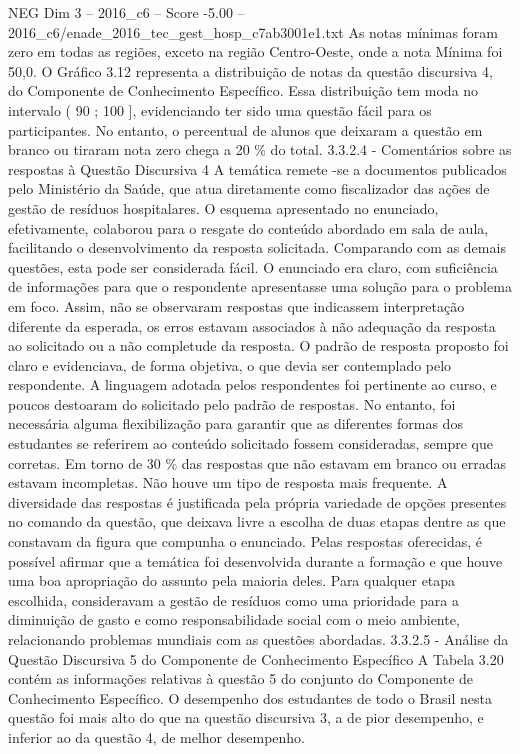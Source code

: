 \begin{textsample}{NEG Dim 3 – 2016\_c6 – Score -5.00 – 2016\_c6/enade\_2016\_tec\_gest\_hosp\_c7ab3001e1.txt}
As notas mínimas foram zero em todas as regiões, exceto na região Centro-Oeste, onde a nota Mínima foi 50,0.
O Gráfico 3.12 representa a distribuição de notas da questão discursiva 4, do Componente de Conhecimento Específico.
Essa distribuição tem moda no intervalo ( 90 ; 100 ], evidenciando ter sido uma questão fácil para os participantes.
No entanto, o percentual de alunos que deixaram a questão em branco ou tiraram nota zero chega a 20 \% do total. 3.3.2.4 - Comentários sobre as respostas à Questão Discursiva 4 A temática remete -se a documentos publicados pelo Ministério da Saúde, que atua diretamente como fiscalizador das ações de gestão de resíduos hospitalares.
O esquema apresentado no enunciado, efetivamente, colaborou para o resgate do conteúdo abordado em sala de aula, facilitando o desenvolvimento da resposta solicitada.
Comparando com as demais questões, esta pode ser considerada fácil.
O enunciado era claro, com suficiência de informações para que o respondente apresentasse uma solução para o problema em foco.
Assim, não se observaram respostas que indicassem interpretação diferente da esperada, os erros estavam associados à não adequação da resposta ao solicitado ou a não completude da resposta.
O padrão de resposta proposto foi claro e evidenciava, de forma objetiva, o que devia ser contemplado pelo respondente.
A linguagem adotada pelos respondentes foi pertinente ao curso, e poucos destoaram do solicitado pelo padrão de respostas.
No entanto, foi necessária alguma flexibilização para garantir que as diferentes formas dos estudantes se referirem ao conteúdo solicitado fossem consideradas, sempre que corretas.
Em torno de 30 \% das respostas que não estavam em branco ou erradas estavam incompletas.
Não houve um tipo de resposta mais frequente.
A diversidade das respostas é justificada pela própria variedade de opções presentes no comando da questão, que deixava livre a escolha de duas etapas dentre as que constavam da figura que compunha o enunciado.
Pelas respostas oferecidas, é possível afirmar que a temática foi desenvolvida durante a formação e que houve uma boa apropriação do assunto pela maioria deles.
Para qualquer etapa escolhida, consideravam a gestão de resíduos como uma prioridade para a diminuição de gasto e como responsabilidade social com o meio ambiente, relacionando problemas mundiais com as questões abordadas. 3.3.2.5 - Análise da Questão Discursiva 5 do Componente de Conhecimento Específico A Tabela 3.20 contém as informações relativas à questão 5 do conjunto do Componente de Conhecimento Específico.
O desempenho dos estudantes de todo o Brasil nesta questão foi mais alto do que na questão discursiva 3, a de pior desempenho, e inferior ao da questão 4, de melhor desempenho.

\end{textsample}
